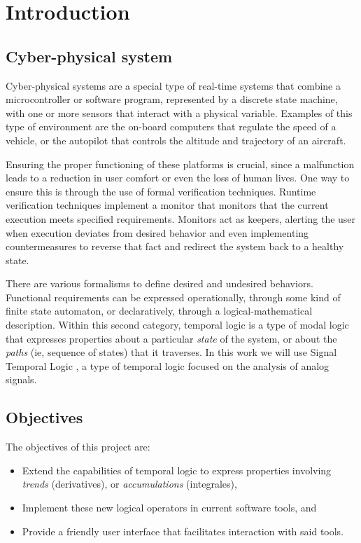 \chapter{Introduction}

\section{Cyber-physical system}
Cyber-physical systems are a special type of real-time systems that combine a microcontroller or software program, represented by a discrete state machine, with one or more sensors that interact with a physical variable. Examples of this type of environment are the on-board computers that regulate the speed of a vehicle, or the autopilot that controls the altitude and trajectory of an aircraft.

Ensuring the proper functioning of these platforms is crucial, since a malfunction leads to a reduction in user comfort or even the loss of human lives. One way to ensure this is through the use of formal verification techniques. Runtime verification techniques \cite{STTT_RV_21} implement a monitor that monitors that the current execution meets specified requirements. Monitors act as keepers, alerting the user when execution deviates from desired behavior and even implementing countermeasures to reverse that fact and redirect the system back to a healthy state.

There are various formalisms to define desired and undesired behaviors. Functional requirements can be expressed operationally, through some kind of finite state automaton, or declaratively, through a logical-mathematical description. Within this second category, temporal logic is a type of modal logic that expresses properties about a particular \emph{state} of the system, or about the \emph{paths} (ie, sequence of states) that it traverses. In this work we will use Signal Temporal Logic \cite{STL}, a type of temporal logic focused on the analysis of analog signals.

\section{Objectives}

The objectives of this project are:

\begin{itemize}
\item Extend the capabilities of temporal logic to express properties involving \textit{trends} (derivatives), or \textit{accumulations} (integrales), 
\item Implement these new logical operators in current software tools, and
\item Provide a friendly user interface that facilitates interaction with said tools.
\end{itemize}


